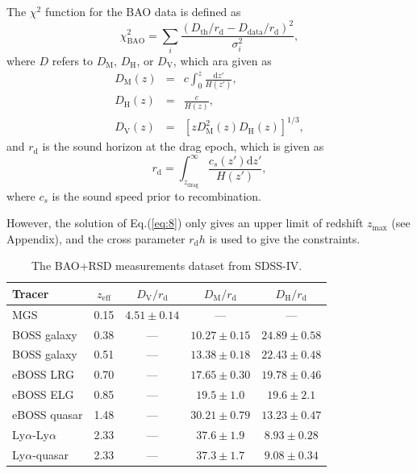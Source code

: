 \documentclass[twocolumn]{aastex631}
\begin{document}
   The $\chi^2$ function for the BAO data is defined as
   \begin{equation}
      \chi_{\text{BAO}}^2=\sum_i\frac{(D_{\text{th}}/r_{\text{d}}-D_{\text{data}}/r_{\text{d}})^2}{\sigma_i^2},
   \end{equation}
   where $D$ refers to $D_{\text{M}}$, $D_{\text{H}}$, or $D_{\text{V}}$, which ara given as
   \begin{eqnarray}
      D_{\text{M}}(z)&=&c\int_0^z\frac{\text{d}z'}{H(z')},\\
      D_{\text{H}}(z)&=&\frac{c}{H(z)},\\
      D_{\text{V}}(z)&=&\left[zD_{\text{M}}^2(z)D_{\text{H}}(z)\right]^{1/3},
   \end{eqnarray}
   and $r_{\text{d}}$ is the sound horizon at the drag epoch, which is given as
   \begin{equation}
      r_{\text{d}}=\int_{z_{\text{drag}}}^{\infty}\frac{c_s(z')\text{d}z'}{H(z')},
   \end{equation}
   where $c_s$ is the sound speed prior to recombination.

   However, the solution of Eq.(\ref{eq:8}) only gives an upper 
   limit of redshift $z_{\max}$ (see Appendix), and the cross 
   parameter $r_{\text{d}}h$ is used to give the constraints.

   \begin{table}[htbp]
      \centering
      \begin{tabular}{lcccc}
         \hline\hline
         Tracer & $z_{\text{eff}}$ & $D_{\text{V}}/r_{\text{d}}$ & 
         $D_{\text{M}}/r_{\text{d}}$ & $D_{\text{H}}/r_{\text{d}}$ \\
         \hline
         MGS & 0.15 & $4.51 \pm 0.14$ & --- & --- \\
         BOSS galaxy & 0.38 & --- & $10.27 \pm 0.15$ & $24.89 \pm 0.58$ \\
         BOSS galaxy & 0.51 & --- & $13.38 \pm 0.18$ & $22.43 \pm 0.48$ \\
         eBOSS LRG & 0.70 & --- & $17.65 \pm 0.30$ & $19.78 \pm 0.46$ \\
         eBOSS ELG & 0.85 & --- & $19.5 \pm 1.0$ & $19.6 \pm 2.1$ \\
         eBOSS quasar& 1.48 & --- & $30.21 \pm 0.79$ & $13.23 \pm 0.47$ \\
         Ly$\alpha$-Ly$\alpha$ & 2.33 & --- & $37.6 \pm 1.9$ & $8.93 \pm 0.28$ \\
         Ly$\alpha$-quasar & 2.33 & --- & $37.3 \pm 1.7$ & $9.08 \pm 0.34$ \\
         \hline
      \end{tabular}
      \caption{The BAO+RSD measurements dataset from SDSS-IV.}
      \label{tab:2}
   \end{table}
\end{document}
